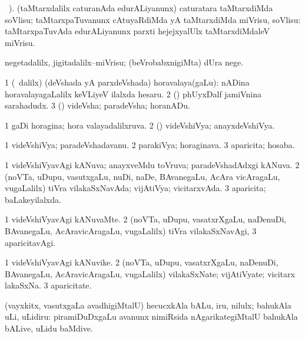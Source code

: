 \bentry
{}
\gl{\sakirx}
\BUkaq\ ).\bmng
(taMtarxdalilx caturanAda edurALiyanunx) caturatara taMtarxdiMda soVlisu; taMtarxpaTuvanunx cAtuyaRdiMda yA taMtarxdiMda miVrisu, soVlisu:  taMtarxpaTuvAda edurALiyanunx parxti hejejxyalUlx taMtarxdiMdaleV miVrisu. 
\emng
\eentry

\bentry
{}
\gl{\sakirx}
\bmng
negetadalilx, jigitadalilx--miVrisu; (beVrobabxnigiMta) dUra nege. 
\emng
\eentry

\bentry
{}
\gl{\nA}
\bmng
\bnum
\num{1} (\sA\ \bava dalilx) (deVshada yA parxdeVshada) horavalaya(gaLu):  nADina horavalayagaLalilx keVLiyeV ilalxda hesaru. 
\num{2} (\pArxparx) phUyxDalf jamiVnina sarahadudx. 
\num{3} (\pArxparx) videVsha; paradeVsha; horanADu. 
\enum
\emng
\eentry

\bentry
{}
\gl{\gu}
\bmng
\bnum
\num{1} gaDi horagina; hora valayadalilxruva. 
\num{2} (\pArxparx) videVshiVya; anayxdeVshiVya. 
\enum
\emng
\eentry

\bentry
{}
\gl{\nA}
\bmng
\bnum
\num{1} videVshiVya; paradeVshadavanu. 
\num{2} parakiVya; horaginava. 
\num{3} aparicita; hosaba. 
\enum
\emng
\eentry

\bentry
{}
\gl{\gu}
\bmng
\bnum
\num{1} videVshiVyavAgi kANuva; anayxveMdu toVruva; paradeVshadAdxgi kANuva. 
\num{2} (noVTa, uDupu, vasutxgaLu, nuDi, naDe, BAvanegaLu, AcAra vicAragaLu, \mo vugaLalilx) tiVra vilakaSxNavAda; vijAtiVya; vicitarxvAda. 
\num{3} aparicita; baLakeyilalxda. 
\enum
\emng
\eentry

\bentry
{}
\gl{\kirxvi}
\bmng
\bnum
\num{1} videVshiVyavAgi kANuvaMte. 
\num{2} (noVTa, uDupu, vasatxrXgaLu, naDenuDi, BAvanegaLu, AcAravicAragaLu, \mo vugaLalilx) tiVra vilakaSxNavAgi, 
\num{3} aparicitavAgi. 
\enum
\emng
\eentry

\bentry
{}
\gl{\nA}
\bmng
\bnum
\num{1} videVshiVyavAgi kANuvike. 
\num{2} (noVTa, uDupu, vasatxrXgaLu, naDenuDi, BAvanegaLu, AcAravicAragaLu, \mo vugaLalilx) vilakaSxNate; vijAtiVyate; vicitarx lakaSxNa. 
\num{3} aparicitate. 
\enum
\emng
\eentry

\bentry
{}
\gl{\sakirx}
\bmng
(vayxkitx, vasutxgaLa \vi avadhigiMtalU) hecucxkAla bALu, iru, nilulx; bahukAla uLi, uLidiru:  piramiDuDxgaLu avanunx nimiRsida nAgarikategiMtalU bahukAla bALive, uLidu baMdive. 
\emng
\eentry

